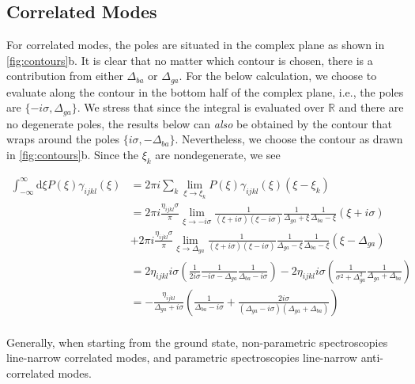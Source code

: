 \documentclass[aip, jcp, reprint, onecolumn, nofootinbib]{revtex4-2}
\begin{document}
\subsection{Correlated Modes}
For correlated modes, the poles are situated in the complex plane as shown in \autoref{fig:contours}b.
It is clear that no matter which contour is chosen, there is a contribution from either $\Delta_{ba}$ or $\Delta_{ga}$. 
For the below calculation, we choose to evaluate along the contour in the bottom half of the complex plane, i.e., the poles are $\{-i\sigma, \Delta_{ga}\}$.
We stress that since the integral is evaluated over $\mathbb{R}$ and there are no degenerate poles, the results below can \textit{also} be obtained by the contour that wraps around the poles $\{i\sigma, -\Delta_{ba}\}$. 
Nevertheless, we choose the contour as drawn in \autoref{fig:contours}b.
Since the $\xi_k$ are nondegenerate, we see
\begin{widetext}
	\begin{equation}
		\begin{split}
			\int_{-\infty}^\infty \mathrm{d}\xi P(\xi) \gamma_{ijkl}(\xi) &= 2\pi i \sum_k \lim_{\xi \rightarrow \xi_k} P(\xi) \gamma_{ijkl}(\xi) (\xi - \xi_k)\\
			&= 2\pi i \frac{\eta_{ijkl} \sigma}{\pi}  \lim_{\xi \rightarrow -i\sigma} \frac{1}{(\xi + i\sigma)(\xi - i\sigma)} \frac{1}{\Delta_{ga} + \xi} \frac{1}{\Delta_{ba} - \xi} \left(\xi + i \sigma\right) \\ 
			&+ 2\pi i \frac{\eta_{ijkl} \sigma}{\pi} \lim_{\xi \rightarrow \Delta_{ga}} \frac{1}{(\xi + i\sigma)(\xi - i\sigma)} \frac{1}{\Delta_{ga} - \xi} \frac{1}{\Delta_{ba} - \xi} \left(\xi - \Delta_{ga}\right)\\
			&= 2 \eta_{ijkl} i \sigma \left(\frac{1}{2 i \sigma} \frac{1}{-i \sigma - \Delta_{ga}} \frac{1}{\Delta_{ba} - i\sigma} \right) - 2\eta_{ijkl} i \sigma \left(\frac{1}{\sigma^2 + \Delta_{ga} ^2} \frac{1}{\Delta_{ga} + \Delta_{ba}} \right)\\
			&= -\frac{\eta_{ijkl}}{\Delta_{ga} + i \sigma} \left(\frac{1}{\Delta_{ba} - i \sigma} + \frac{2i\sigma}{(\Delta_{ga} - i \sigma)(\Delta_{ga} + \Delta_{ba})}\right)\\
		\end{split}
	\end{equation}
\end{widetext}
Generally, when starting from the ground state, non-parametric spectroscopies line-narrow correlated modes, and parametric spectroscopies line-narrow anti-correlated modes. \cite{Dick83_1, RN425}
\end{document}
